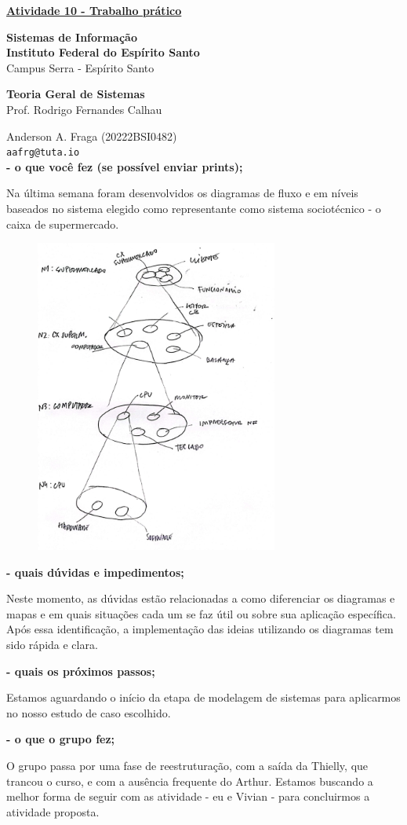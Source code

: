 \documentclass[11pt]{article}
\begin{document}
\underline{\textbf{Atividade 10 - Trabalho prático}}\par
\textbf{Sistemas de Informação}\\
\textbf{Instituto Federal do Espírito Santo}\\
Campus Serra - Espírito Santo\par
\textbf{Teoria Geral de Sistemas}\\
Prof. Rodrigo Fernandes Calhau\par
Anderson A. Fraga (20222BSI0482)\\
\texttt{aafrg@tuta.io}\\  %

\textbf{- o que você fez (se possível enviar prints);}\par
Na última semana foram desenvolvidos os diagramas de fluxo e em níveis baseados no sistema elegido como representante como sistema sociotécnico - o caixa de supermercado.
\begin{figure}[!h]
    \centering
    \includegraphics[width=8cm]{diagrama de niveis.PNG}
\end{figure}

\textbf{- quais dúvidas e impedimentos;}\par
Neste momento, as dúvidas estão relacionadas a como diferenciar os diagramas e mapas e em quais situações cada um se faz útil ou sobre sua aplicação específica. Após essa identificação, a implementação das ideias utilizando os diagramas tem sido rápida e clara.

\textbf{- quais os próximos passos;}\par
Estamos aguardando o início da etapa de modelagem de sistemas para aplicarmos no nosso estudo de caso escolhido.

\textbf{- o que o grupo fez;}\par
O grupo passa por uma fase de reestruturação, com a saída da Thielly, que trancou o curso, e com a ausência frequente do Arthur. Estamos buscando a melhor forma de seguir com as atividade - eu e Vivian - para concluirmos a atividade proposta.
\end{document}
